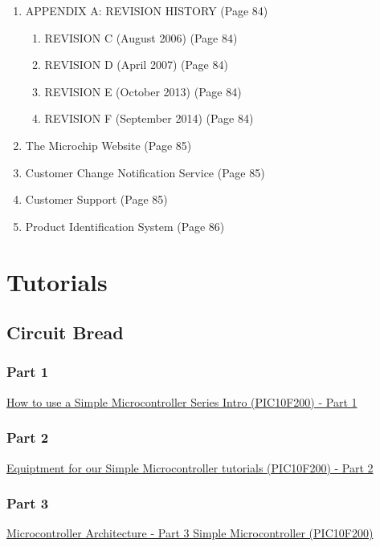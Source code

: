 \documentclass[12pt, letterpaper]{article}
\begin{document}
\begin{enumerate}
  \item [] APPENDIX A: REVISION HISTORY (Page 84)
  \begin{enumerate}
    \item [] REVISION C (August 2006) (Page 84)
    \item [] REVISION D (April 2007) (Page 84)
    \item [] REVISION E (October 2013) (Page 84)
    \item [] REVISION F (September 2014) (Page 84)
  \end{enumerate}

  \item [] The Microchip Website (Page 85)

  \item [] Customer Change Notification Service (Page 85)

  \item [] Customer Support (Page 85)

  \item [] Product Identification System (Page 86)
\end{enumerate}

\section{Tutorials}
\subsection{Circuit Bread}
\subsubsection{Part 1}
\href{https://www.circuitbread.com/tutorials/how-to-use-a-simple-microcontroller-series-intro-pic10f200-part-1}{How to use a Simple Microcontroller Series Intro (PIC10F200) - Part 1}\\
\subsubsection{Part 2}
\href{https://www.circuitbread.com/tutorials/equipment-for-our-simple-microcontroller-tutorials-pic10f200-part-2}{Equiptment for our Simple Microcontroller tutorials (PIC10F200) - Part 2}\\
\subsubsection{Part 3}
\href{https://www.circuitbread.com/tutorials/microcontroller-architecture-part-3-simple-microcontroller-pic10f200}{Microcontroller Architecture - Part 3 Simple Microcontroller (PIC10F200)}\\
\end{document}
